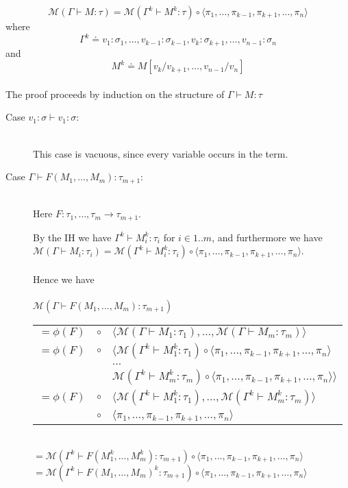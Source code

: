\documentclass{article}
\begin{document}
$$ \mathcal M(\Gamma \vdash M : \tau) = \mathcal M(\Gamma^k \vdash M^k : \tau) \circ \langle \pi_1, \ldots, \pi_{k-1},\pi_{k+1}, \ldots, \pi_n \rangle $$
where
$$ \Gamma^k \doteq v_1 : \sigma_1, \ldots, v_{k-1} : \sigma_{k-1}, v_k : \sigma_{k+1}, \ldots, v_{n-1} : \sigma_n $$
and
$$ M^k \doteq M[v_k/v_{k+1},\ldots,v_{n-1}/v_n]$$~\\

The proof proceeds by induction on the structure of $\Gamma \vdash M : \tau$

\begin{description}
\item[Case $v_1 : \sigma \vdash v_1 : \sigma$:]~\\
This case is vacuous, since every variable occurs in the term.
\item[Case $\Gamma \vdash F(M_1,\ldots,M_m) : \tau_{m+1}$:]~\\
Here $F : \tau_1, \ldots, \tau_m \to \tau_{m+1}$. 

By the IH we have $\Gamma^k \vdash M_i^k : \tau_i$ for 
$i \in 1..m$, and furthermore we have $\mathcal M(\Gamma \vdash M_i : \tau_i) = \mathcal M(\Gamma^k \vdash M_i^k : \tau_i)
\circ \langle \pi_1, \ldots, \pi_{k-1},\pi_{k+1},\ldots,\pi_n \rangle$.\\~\\
Hence we have\\~\\
$\mathcal M(\Gamma \vdash F(M_1,\ldots,M_m) : \tau_{m+1})$ \\
\begin{tabular}{lll}
$= \phi(F)$ & $\circ$ & $\langle \mathcal M(\Gamma \vdash M_1 : \tau_1), \ldots, \mathcal M(\Gamma \vdash M_m : \tau_m) \rangle$ \\
$= \phi(F)$ & $\circ$ & $\langle \mathcal 
  M(\Gamma^k \vdash M_1^k : \tau_1) \circ \langle \pi_1,\ldots,\pi_{k-1},\pi_{k+1},\ldots,\pi_n\rangle$ \\
 & & $\ldots$ \\
 & & $\mathcal M(\Gamma^k \vdash M_m^k : \tau_m) \circ \langle \pi_1,\ldots,\pi_{k-1},\pi_{k+1},\ldots,\pi_n \rangle \rangle$ \\
$= \phi(F)$ & $\circ$ & $\langle \mathcal M(\Gamma^k \vdash M_1^k : \tau_1), \ldots, \mathcal M(\Gamma^k \vdash M_m^k : \tau_m) \rangle$ \\
 & $\circ$ & $\langle \pi_1, \ldots, \pi_{k-1}, \pi_{k+1}, \ldots, \pi_n \rangle$
\end{tabular}\\
$= \mathcal M(\Gamma^k \vdash F(M_1^k,\ldots, M_m^k) : \tau_{m+1}) \circ \langle \pi_1, \ldots, \pi_{k-1}, \pi_{k+1}, \ldots, \pi_n \rangle$ \\
$= \mathcal M(\Gamma^k \vdash F(M_1,\ldots, M_m)^k : \tau_{m+1}) \circ \langle \pi_1, \ldots, \pi_{k-1}, \pi_{k+1}, \ldots, \pi_n \rangle$


\end{description}
\end{document}
